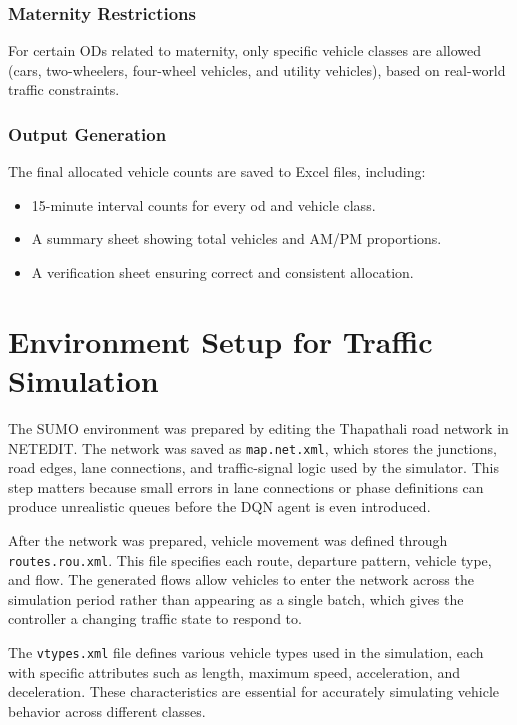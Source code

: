 \subsubsection{Maternity Restrictions}
For certain ODs related to maternity, only specific vehicle classes are allowed (\eg cars, two-wheelers, four-wheel vehicles, and utility vehicles), based on real-world traffic constraints.

\subsubsection{Output Generation}
The final allocated vehicle counts are saved to Excel files, including:
\begin{itemize}
    \item 15-minute interval counts for every \gls{od} and vehicle class.
    \item A summary sheet showing total vehicles and AM/PM proportions.
    \item A verification sheet ensuring correct and consistent allocation.
\end{itemize}

\section{Environment Setup for Traffic Simulation}
\label{sec:env_setup}

The SUMO environment was prepared by editing the Thapathali road network in NETEDIT. The network was saved as \texttt{map.net.xml}, which stores the junctions, road edges, lane connections, and traffic-signal logic used by the simulator. This step matters because small errors in lane connections or phase definitions can produce unrealistic queues before the DQN agent is even introduced.

After the network was prepared, vehicle movement was defined through \texttt{routes.rou.xml}. This file specifies each route, departure pattern, vehicle type, and flow. The generated flows allow vehicles to enter the network across the simulation period rather than appearing as a single batch, which gives the controller a changing traffic state to respond to.

The \texttt{vtypes.xml} file defines various vehicle types used in the simulation, each with specific attributes such as length, maximum speed, acceleration, and deceleration. These characteristics are essential for accurately simulating vehicle behavior across different classes.

